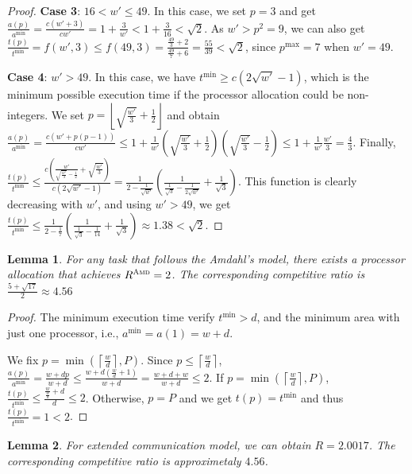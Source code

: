 \documentclass{article}
\newtheorem{lemma}{Lemma}
\newcommand\AMD{\textsc{Amd}\xspace}
\begin{document}
\begin{proof}
\textbf{Case 3}: $16 < w' \leq 49$. In this case, we set $p=3$ and get $\frac{a(p)}{a^{\min}} =\frac{c(w'+3)}{cw'}=1+\frac{3}{w'} < 1+\frac{3}{16}<\sqrt{2}$. As $w'>p^2=9$, we can also get $\frac{t(p)}{t^{\min}}=f(w',3) \leq f(49,3)=\frac{\frac{49}{3}+2}{\frac{49}{7}+6}=\frac{55}{39}<\sqrt{2}$, since $p^{\max}=7$ when $w'=49$.

\textbf{Case 4}: $w'>49$. In this case, we have $t^{\min} \geq c(2\sqrt{w'}-1)$, which is the minimum possible execution time if the processor allocation could be non-integers. We set $p=\left\lfloor \sqrt{\frac{w'}{3}}+\frac{1}{2} \right\rfloor$ and obtain $\frac{a(p)}{a^{\min}}=\frac{c(w'+p(p-1))}{cw'}\leq 1+\frac{1}{w'}\left( \sqrt{\frac{w'}{3}}+\frac{1}{2}\right)\left(\sqrt{\frac{w'}{3}}-\frac{1}{2}\right)\leq 1+\frac{1}{w'}\frac{w'}{3} = \frac{4}{3}$.
Finally, $\frac{t(p)}{t^{\min}} \leq \frac{c\left(\frac{w'}{\sqrt{\frac{w'}{3}}-\frac{1}{2}} +\sqrt{\frac{w'}{3}}\right)}{c(2\sqrt{w'}-1)}=\frac{1}{2-\frac{1}{\sqrt{w'}}}\left(\frac{1}{\frac{1}{\sqrt{3}}-\frac{1}{2\sqrt{w'}}} +\frac{1}{\sqrt{3}}\right)$.
This function is clearly decreasing with $w'$, and using $w'>49$, we get $\frac{t(p)}{t^{\min}} \leq \frac{1}{2-\frac{1}{7}}\left(\frac{1}{\frac{1}{\sqrt{3}}-\frac{1}{14}} +\frac{1}{\sqrt{3}}\right) \approx 1.38<\sqrt{2}$.
\end{proof}

\begin{lemma}\label{lem.amdahl}
For any task that follows the Amdahl's model, there exists a processor allocation that achieves $R^{\AMD}=2$. The corresponding competitive ratio is $\frac{5+\sqrt{17}}{2} \approx 4.56$
\end{lemma}

\begin{proof}
The minimum execution time verify $t^{\min} > d$, and the minimum area with just one processor, i.e., $a^{\min} = a(1) = w+d$.

We fix $p=\min(\left\lceil \frac{w}{d} \right\rceil, P)$. Since $p \leq \left\lceil \frac{w}{d} \right\rceil$, $\frac{a(p)}{a^{\min}} = \frac{w+dp}{w+d} \leq \frac{w+d\left(\frac{w}{d}+1\right)}{w+d} = \frac{w+d+w}{w+d}\leq 2$.
If $p=\min(\left\lceil \frac{w}{d} \right\rceil, P)$, $\frac{t(p)}{t^{\min}} \leq \frac{\frac{w}{\frac{w}{d}}+d}{d} \leq 2$. Otherwise, $p=P$ and we get $t(p) = t^{\min}$ and thus $\frac{t(p)}{t^{\min}}=1<2$.

\end{proof}



\begin{lemma}
For extended communication model, we can obtain $R=2.0017$. The corresponding competitive ratio is approximetaly $4.56$.
\end{lemma}
\end{document}
